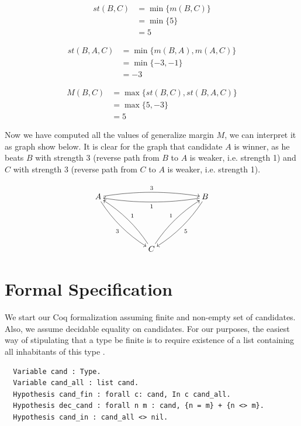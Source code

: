 \begin{align}
st (B, C)&=  \min \lbrace m (B, C) \rbrace  \nonumber \\
					  &= \min \lbrace 5 \rbrace  \nonumber \\
                     &= 5 \nonumber
\end{align}


\begin{align}
st (B, A, C)&= \min \lbrace m (B, A), m (A, C) \rbrace  \nonumber \\
                     &= \min \lbrace -3, -1\rbrace \nonumber \\
                     &= -3\nonumber
\end{align}

\begin{align}
M (B, C)&=  \max \lbrace st (B, C), st(B, A, C) \rbrace \nonumber \\
                     &= \max \lbrace 5, -3 \rbrace \nonumber \\
                     &= 5\nonumber
\end{align}

\noindent
Now we have computed all the values of generalize margin $M$, we can interpret it as 
graph show below.  It is clear for the graph that candidate $A$ is winner, as he beats 
$B$ with strength 3 (reverse path from $B$ to $A$ is weaker, i.e. strength 1) and 
$C$ with strength 3 (reverse path from $C$ to $A$ is weaker, i.e. strength 1). 

\[
 \xymatrix@R=12ex@C=12ex{
A \ar@/^/[rr]^{3} \ar@/_/[dr]_{3} & & B \ar@/^/[ll]^{1}
\ar@/^/[dl]^5 \\
& C \ar@/_/[ul]_{1} \ar@/^/[ur]^{1}
}\]
	 
	
	
\section{Formal Specification} \label{sec:spec}
	We start our Coq formalization assuming finite  and non-empty 
	set of candidates. Also, we assume decidable equality on 
	candidates. For our purposes, the
	easiest way of stipulating that a type be finite is to require
	existence of a list containing all inhabitants of this type \citep{DBLP:conf/icfp/FirsovU15}.

\begin{verbatim}
  Variable cand : Type.
  Variable cand_all : list cand.
  Hypothesis cand_fin : forall c: cand, In c cand_all.
  Hypothesis dec_cand : forall n m : cand, {n = m} + {n <> m}.
  Hypothesis cand_in : cand_all <> nil.
\end{verbatim}

